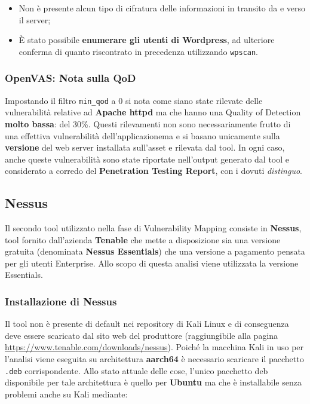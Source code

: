 \documentclass[a4paper, 12pt, oneside]{article}
\begin{document}
\begin{itemize}
    \item Non è presente alcun tipo di cifratura delle informazioni in transito da e verso il server;
    \item È stato possibile \textbf{enumerare gli utenti di Wordpress}, ad ulteriore conferma di quanto riscontrato in precedenza utilizzando \texttt{wpscan}.
\end{itemize}

\subsubsection{OpenVAS: Nota sulla QoD}
Impostando il filtro \texttt{min\_qod} a 0 si nota come siano state rilevate delle vulnerabilità relative ad \textbf{Apache httpd} ma che hanno una Quality of Detection \textbf{molto bassa}: del 30\%. Questi rilevamenti non sono necessariamente frutto di una effettiva vulnerabilità dell'applicazionema e si basano unicamente sulla \textbf{versione} del web server installata sull'asset e rilevata dal tool. In ogni caso, anche queste vulnerabilità sono state riportate nell'output generato dal tool e considerato a corredo del \textbf{Penetration Testing Report}, con i dovuti \textit{distinguo}.

\subsection{Nessus}
Il secondo tool utilizzato nella fase di Vulnerability Mapping consiste in \textbf{Nessus}, tool fornito dall'azienda \textbf{Tenable} che mette a disposizione sia una versione gratuita (denominata \textbf{Nessus Essentials}) che una versione a pagamento pensata per gli utenti Enterprise. Allo scopo di questa analisi viene utilizzata la versione Essentials.

\subsubsection{Installazione di Nessus}
Il tool non è presente di default nei repository di Kali Linux e di conseguenza deve essere scaricato dal sito web del produttore (raggiungibile alla pagina \url{https://www.tenable.com/downloads/nessus}). Poiché la macchina Kali in uso per l'analisi viene eseguita su architettura \textbf{aarch64} è necessario scaricare il pacchetto \texttt{.deb} corrispondente. Allo stato attuale delle cose, l'unico pacchetto deb disponibile per tale architettura è quello per \textbf{Ubuntu} ma che è installabile senza problemi anche su Kali mediante:
\end{document}
